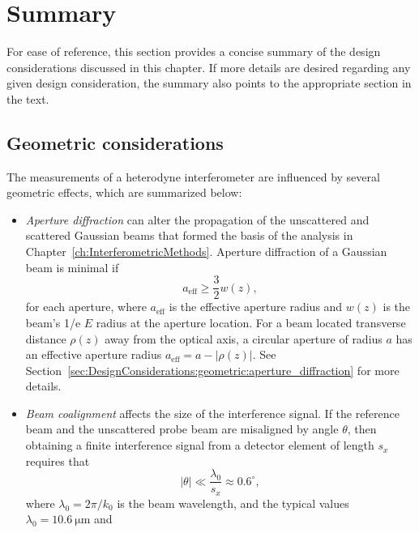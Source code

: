 \section{Summary}
\label{sec:DesignConsiderations:summary}
For ease of reference, this section provides a concise summary
of the design considerations discussed in this chapter.
If more details are desired regarding any given design consideration,
the summary also points to the appropriate section in the text.


\subsection{Geometric considerations}
The measurements of a heterodyne interferometer
are influenced by several geometric effects,
which are summarized below:
\begin{itemize}
  \item \emph{Aperture diffraction} can alter the propagation
    of the unscattered and scattered Gaussian beams
    that formed the basis of the analysis in
    Chapter~\ref{ch:InterferometricMethods}.
    Aperture diffraction of a Gaussian beam is minimal if
    \begin{equation}
      a_{\text{eff}} \geq \frac{3}{2} w(z),
      \label{eq:DesignConsiderations:summary:aperture_radius_for_minimal_diffraction}
    \end{equation}
    for each aperture, where
    $a_{\text{eff}}$ is the effective aperture radius and
    $w(z)$ is the beam's 1/e $E$ radius at the aperture location.
    For a beam located transverse distance
    $\rho(z)$ away from the optical axis,
    a circular aperture of radius $a$ has
    an effective aperture radius $a_{\text{eff}} = a - |\rho(z)|$.
    See Section~\ref{sec:DesignConsiderations:geometric:aperture_diffraction}
    for more details.
  \item \emph{Beam coalignment} affects
    the size of the interference signal.
    If the reference beam and the unscattered probe beam
    are misaligned by angle $\theta$,
    then obtaining a finite interference signal
    from a detector element of length $s_x$
    requires that
    \begin{equation}
      |\theta|
      \ll
      \frac{\lambda_0}{s_x}
      \approx
      0.6^{\circ},
      \label{eq:DesignConsiderations:summary:coalignment_constraint}
    \end{equation}
    where $\lambda_0 = 2 \pi / k_0$ is the beam wavelength,
    and the typical values
    $\lambda_0 = \SI{10.6}{\micro\meter}$ and

\end{itemize}
